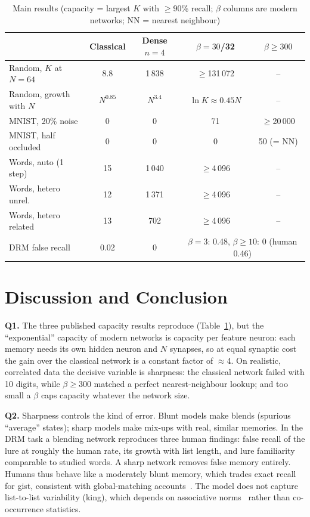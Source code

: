 \documentclass[conference]{IEEEtran}
\begin{document}
\begin{table}[t]
\caption{Main results (capacity = largest $K$ with $\ge$90\% recall; $\beta$ columns are modern networks; NN = nearest neighbour)}
\label{tab:sum}
\centering\scriptsize
\setlength{\tabcolsep}{2.2pt}
\begin{tabular}{@{}lcccc@{}}
\toprule
 & Classical & Dense $n{=}4$ & $\beta{=}30$/32 & $\beta{\ge}300$ \\
\midrule
Random, $K$ at $N{=}64$ & 8.8 & 1\,838 & $\ge$131\,072 & -- \\
Random, growth with $N$ & $N^{0.85}$ & $N^{3.4}$ & $\ln K{\approx}0.45N$ & -- \\
MNIST, 20\% noise & 0 & 0 & 71 & $\ge$20\,000 \\
MNIST, half occluded & 0 & 0 & 0 & 50 (= NN) \\
Words, auto (1 step) & 15 & 1\,040 & $\ge$4\,096 & -- \\
Words, hetero unrel.\ & 12 & 1\,371 & $\ge$4\,096 & -- \\
Words, hetero related & 13 & 702 & $\ge$4\,096 & -- \\
\midrule
DRM false recall & 0.02 & 0 & \multicolumn{2}{c}{$\beta{=}3$: 0.48, $\beta{\ge}10$: 0 (human 0.46)} \\
\bottomrule
\end{tabular}
\end{table}

\section{Discussion and Conclusion}
\textbf{Q1.} The three published capacity results reproduce (Table~\ref{tab:sum}), but the ``exponential'' capacity of modern networks is capacity per feature neuron: each memory needs its own hidden neuron and $N$ synapses, so at equal synaptic cost the gain over the classical network is a constant factor of $\approx$4. On realistic, correlated data the decisive variable is sharpness: the classical network failed with 10 digits, while $\beta\ge300$ matched a perfect nearest-neighbour lookup; and too small a $\beta$ caps capacity whatever the network size.

\textbf{Q2.} Sharpness controls the kind of error. Blunt models make blends (spurious ``average'' states); sharp models make mix-ups with real, similar memories. In the DRM task a blending network reproduces three human findings: false recall of the lure at roughly the human rate, its growth with list length, and lure familiarity comparable to studied words. A sharp network removes false memory entirely. Humans thus behave like a moderately blunt memory, which trades exact recall for gist, consistent with global-matching accounts~\cite{arndt98}. The model does not capture list-to-list variability (king), which depends on associative norms~\cite{roediger95} rather than co-occurrence statistics.
\end{document}
